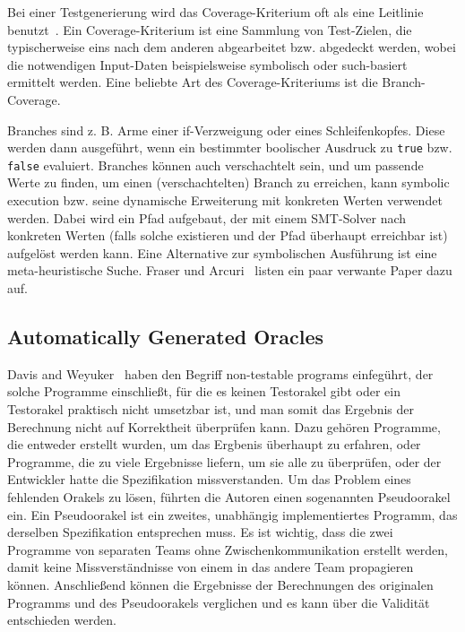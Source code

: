 \documentclass{article}
\begin{document}
Bei einer Testgenerierung wird das Coverage-Kriterium oft als eine Leitlinie benutzt~\cite{Fraser_2011}. Ein Coverage-Kriterium ist eine Sammlung von Test-Zielen, die typischerweise eins nach dem anderen abgearbeitet bzw. abgedeckt werden, wobei die notwendigen Input-Daten beispielsweise symbolisch oder such-basiert ermittelt werden. Eine beliebte Art des Coverage-Kriteriums ist die Branch-Coverage. 

Branches sind z. B. Arme einer if-Verzweigung oder eines Schleifenkopfes. Diese werden dann ausgeführt, wenn ein bestimmter boolischer Ausdruck zu \lstinline{true} bzw. \lstinline{false} evaluiert. Branches können auch verschachtelt sein, und um passende Werte zu finden, um einen (verschachtelten) Branch zu erreichen, kann symbolic execution bzw. seine dynamische Erweiterung mit konkreten Werten verwendet werden. Dabei wird ein Pfad aufgebaut, der mit einem \ac{SMT}-Solver nach konkreten Werten (falls solche existieren und der Pfad überhaupt erreichbar ist) aufgelöst werden kann. Eine Alternative zur symbolischen Ausführung ist eine meta-heuristische Suche. Fraser und Arcuri~\cite{Fraser_2011} listen ein paar verwante Paper dazu auf. 

\subsection{Automatically Generated Oracles}
\label{sec:generated-oracles}
Davis and Weyuker~\cite{10.1145/800175.809889} haben den Begriff non-testable programs einfegührt, der solche Programme einschließt, für die es keinen Testorakel gibt oder ein Testorakel praktisch nicht umsetzbar ist, und man somit das Ergebnis der Berechnung nicht auf Korrektheit überprüfen kann. Dazu gehören Programme, die entweder erstellt wurden, um das Ergbenis überhaupt zu erfahren, oder Programme, die zu viele Ergebnisse liefern, um sie alle zu überprüfen, oder der Entwickler hatte die Spezifikation missverstanden. Um das Problem eines fehlenden Orakels zu lösen, führten die Autoren einen sogenannten Pseudoorakel ein. Ein Pseudoorakel ist ein zweites, unabhängig implementiertes Programm, das derselben Spezifikation entsprechen muss. Es ist wichtig, dass die zwei Programme von separaten Teams ohne Zwischenkommunikation erstellt werden, damit keine Missverständnisse von einem in das andere Team propagieren können. Anschließend können die Ergebnisse der Berechnungen des originalen Programms und des Pseudoorakels verglichen und es kann über die Validität entschieden werden. 
\end{document}
